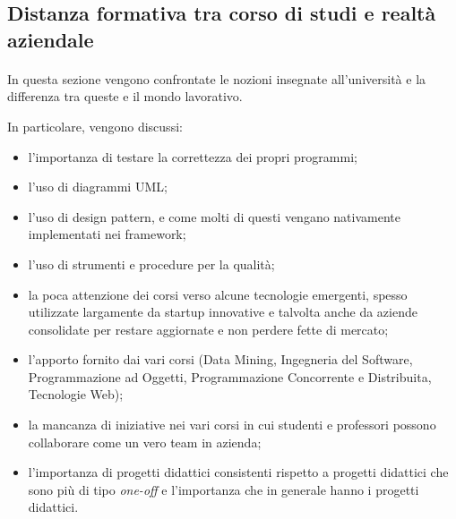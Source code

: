 \documentclass[
article,
10pt, %
oneside, %
BCOR5mm, %
]{scrartcl}
\begin{document}
\subsection{Distanza formativa tra corso di studi e realtà aziendale}
\paragraph{} In questa sezione vengono confrontate le nozioni insegnate
all'università e la differenza tra queste e il mondo lavorativo.

In particolare, vengono discussi:

\begin{itemize}
\item l'importanza di testare la correttezza dei propri programmi;
\item l'uso di diagrammi UML;
\item l'uso di design pattern, e come molti di questi vengano nativamente
  implementati nei framework;
\item l'uso di strumenti e procedure per la qualità;
\item la poca attenzione dei corsi verso alcune tecnologie emergenti,
  spesso utilizzate largamente da startup innovative e talvolta anche da
  aziende consolidate per restare aggiornate e non perdere fette di mercato;
\item l'apporto fornito dai vari corsi (Data Mining, Ingegneria del Software,
  Programmazione ad Oggetti, Programmazione Concorrente e Distribuita,
  Tecnologie Web);
\item la mancanza di iniziative nei vari corsi in cui studenti e professori
  possono collaborare come un vero team in azienda;
\item l'importanza di progetti didattici consistenti rispetto a progetti
  didattici che sono più di tipo \emph{one-off} e l'importanza che in generale
  hanno i progetti didattici.
\end{itemize}
\end{document}
